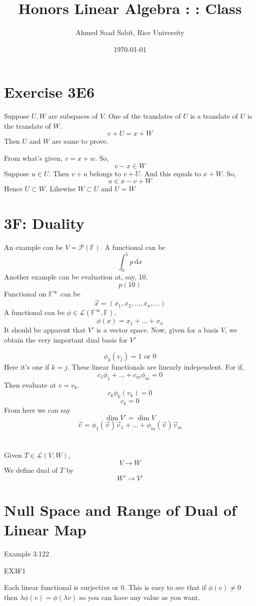\documentclass[letter]{article}
\title{Honors Linear Algebra : : Class}
\author{Ahmed Saad Sabit, Rice University}
\date{\today}
\begin{document}
\maketitle

\section*{Exercise 3E6}
Suppose $U, W$ are subspaces of $V$. One of the translates of $U$ is a translate of $U$ is the translate of $W$. 
\[
v  + U = x + W
\] 
Then $U$ and $W$ are same to prove. 

From what's given, $v = x  + w$. So, 
\[
v - x \in W
\] 
Suppose $u \in U$. Then $v+ u$ belongs to $v + U$. And  this equals to $x + W$. 
So, 
\[
u \in x - v + W 
\] 
Hence $U \subset W$. Likewise $W \subset U$ and $U = W$ 

\section*{3F: Duality} 

An example can be $V = \mathcal P (\mathbb{F})$. A functional can be \[
\int _0^{1} p \, \mathrm{d} x
\]
Another example can be evaluation at, say, 10, 
\[
p(10)
\] 
Functional on $\mathbb{F}^{\infty}$ can be 
\[
\vec{x} = \left(x_1, x_2, \ldots, x_n, \ldots\right)
\]
A functional can be $\phi \in \mathcal L (\mathbb{F}^{\infty}, \mathbb{F})$, 
\[
\phi (x) = x_1 + \ldots  + x_n
\]
It should be apparent that $V'$ is a vector space. Now, given for a basis $V$, we obtain the very important dual basis for $V'$ 

\[
\phi_k (v_j) = 1 \text{ or } 0
\] 
Here it's one if $ k = j$. These linear functionals are linearly independent. For if, 
\[
c_1 \phi_1  + \ldots + c_m \phi_m = 0
\] 
Then evaluate at $v = v_k$. 
\[
c_k \phi_k(v_k) = 0
\] 
\[
c_k = 0
\] 
From here we can say 
\[
\dim V' = \dim V
\]
\[
\vec{v} = \phi_1(\vec{v}) \vec{v}_1 + \ldots + \phi_m (\vec{v}) \vec{v}_m
\]

\section*{}
Given $T \in  \mathcal L (V, W)$, 
\[
V \to  W 
\] 
We define dual of $T$ by 
\[
W' \to V'
\]

\section*{Null Space and Range of Dual of Linear Map} 
Example 3.122

EX3F1 

Each linear functional is surjective or $0$. This is easy to see that if  $\phi(v) \neq  0$ then $\lambda \phi(v) = \phi(\lambda v)$ so you can have any value as you want. 
\end{document}
